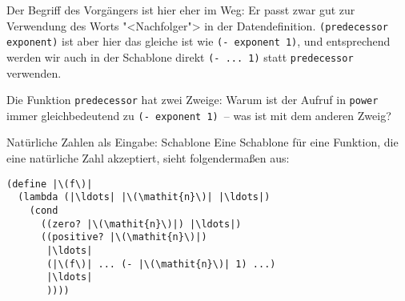 Der Begriff des Vorgängers ist hier eher im Weg: Er passt zwar gut zur
Verwendung des Worts "<Nachfolger"> in der
Datendefinition. \lstinline{(predecessor exponent)} ist aber hier das
gleiche ist wie \lstinline{(- exponent 1)}, und entsprechend werden
wir auch in der Schablone direkt \lstinline{(- ... 1)} statt
\lstinline{predecessor} verwenden.
\begin{aufgabe}
  Die Funktion \lstinline{predecessor} hat zwei Zweige: Warum ist der
  Aufruf in \lstinline{power} immer gleichbedeutend zu
  \lstinline{(- exponent 1)}~-- was ist mit dem anderen Zweig?
\end{aufgabe}


\begin{konstruktionsanleitung}{Natürliche Zahlen als Eingabe: Schablone}
  \label{ka:nats-eingabe-schablone}
  Eine Schablone für eine Funktion, die eine natürliche Zahl akzeptiert, sieht
folgendermaßen aus:
%
\begin{lstlisting}
(define |\(f\)|
  (lambda (|\ldots| |\(\mathit{n}\)| |\ldots|)
    (cond
      ((zero? |\(\mathit{n}\)|) |\ldots|)
      ((positive? |\(\mathit{n}\)|)
       |\ldots|
       (|\(f\)| ... (- |\(\mathit{n}\)| 1) ...)
       |\ldots|
       ))))
\end{lstlisting}
  
\end{konstruktionsanleitung}

